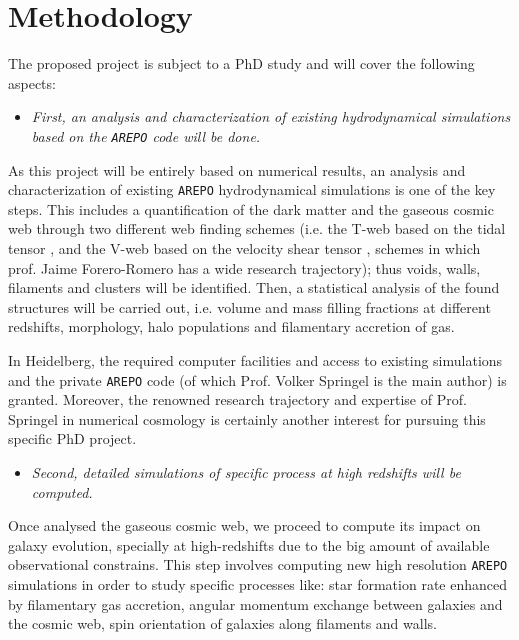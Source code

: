 \documentclass[a4,useAMS,usenatbib,usegraphicx,12pt]{article}
\begin{document}
\section{Methodology}


The proposed project is subject to a PhD study and will cover the following 
aspects:


\begin{itemize}

\item[\checkmark] \textit{First, an analysis and characterization of existing 
hydrodynamical simulations based on the \texttt{AREPO} code will be done.}

\end{itemize}


As this project will be entirely based on numerical results, an analysis and 
characterization of existing \texttt{AREPO} hydrodynamical simulations is one 
of the key steps. This includes a quantification of the dark matter and the 
gaseous cosmic web through two different web finding schemes (i.e. the T-web 
based on the tidal tensor \citep{Hahn07,Forero09}, and the V-web based on the 
velocity shear tensor \citep{Hoffman12}, schemes in which prof. Jaime 
Forero-Romero has a wide research trajectory); thus voids, walls, filaments 
and clusters will be identified. Then, a statistical analysis of the found 
structures will be carried out, i.e. volume and mass filling fractions at 
different redshifts, morphology, halo populations and filamentary accretion of 
gas.


In Heidelberg, the required computer facilities and access to existing 
simulations and the private \texttt{AREPO} code (of which Prof. Volker 
Springel is the main author) is granted. Moreover, the renowned research 
trajectory and expertise of Prof. Springel in numerical cosmology is 
certainly another interest for pursuing this specific PhD project.


\begin{itemize}

\item[\checkmark] \textit{Second, detailed simulations of specific process at
high redshifts will be computed.}

\end{itemize}


Once analysed the gaseous cosmic web, we proceed to compute its impact on 
galaxy evolution, specially at high-redshifts due to the big amount of 
available observational constrains. This step involves computing new high 
resolution \texttt{AREPO} simulations in order to study specific processes 
like: star formation rate enhanced by filamentary gas accretion, angular 
momentum exchange between galaxies and the cosmic web, spin orientation of 
galaxies along filaments and walls.
\end{document}
